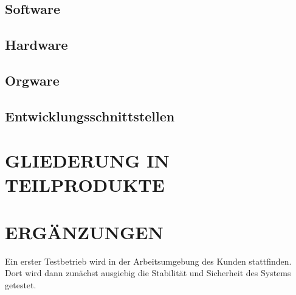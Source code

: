 	\subsection{Software}
	\subsection{Hardware}
	\subsection{Orgware}
	\subsection{Entwicklungsschnittstellen}
	
	
	\section{\Large GLIEDERUNG IN TEILPRODUKTE}
	
	
	\section{\Large ERGÄNZUNGEN}
	Ein erster Testbetrieb wird in der Arbeitsumgebung des Kunden stattfinden. Dort wird dann zunächst ausgiebig die Stabilität und Sicherheit des Systems getestet.
	
\newpage
